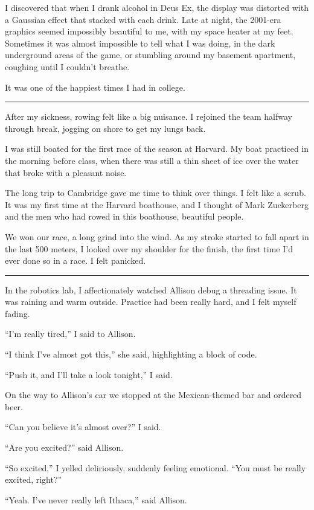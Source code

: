 I discovered that when I drank alcohol in Deus Ex, the display was distorted
with a Gaussian effect that stacked with each drink.  Late at night, the
2001-era graphics seemed impossibly beautiful to me, with my space heater at my
feet.  Sometimes it was almost impossible to tell what I was doing, in the dark
underground areas of the game, or stumbling around my basement apartment,
coughing until I couldn't breathe.

It was one of the happiest times I had in college.

\plainfancybreak{12pt}{2}{}

After my sickness, rowing felt like a big nuisance.  I rejoined the team halfway
through break, jogging on shore to get my lungs back.  

I was still boated for the first race of the season at Harvard.  My boat
practiced in the morning before class, when there was still a thin sheet of ice
over the water that broke with a pleasant noise.  

The long trip to Cambridge gave me time to think over things.  I felt like a
scrub.  It was my first time at the Harvard boathouse, and I thought of Mark
Zuckerberg and the men who had rowed in this boathouse, beautiful people. 

We won our race, a long grind into the wind.  As my stroke started to fall apart
in the last 500 meters, I looked over my shoulder for the finish, the first time
I'd ever done so in a race.  I felt panicked.

\plainfancybreak{12pt}{2}{}

In the robotics lab, I affectionately watched Allison debug a threading issue.
It was raining and warm outside.  Practice had been really hard, and I felt
myself fading.

``I'm really tired,'' I said to Allison.

``I think I've almost got this,'' she said, highlighting a block of code.

``Push it, and I'll take a look tonight,'' I said.

On the way to Allison's car we stopped at the Mexican-themed bar and ordered
beer.

``Can you believe it's almost over?'' I said.

``Are you excited?'' said Allison.

``So excited,'' I yelled deliriously, suddenly feeling emotional.  ``You must be
really excited, right?''

``Yeah.  I've never really left Ithaca,'' said Allison.

